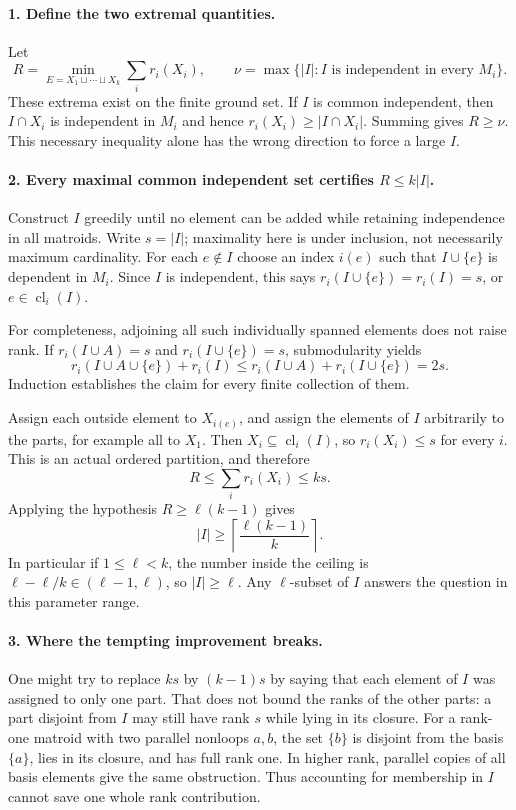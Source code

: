 \documentclass[11pt,a4paper]{article}
\begin{document}
\paragraph{1. Define the two extremal quantities.}
Let
\[
 R=\min_{E=X_1\sqcup\cdots\sqcup X_k}\sum_i r_i(X_i),\qquad
 \nu=\max\{|I|: I\text{ is independent in every }M_i\}.
\]
These extrema exist on the finite ground set. If $I$ is common
independent, then $I\cap X_i$ is independent in $M_i$ and hence
$r_i(X_i)\ge|I\cap X_i|$. Summing gives $R\ge\nu$. This
necessary inequality alone has the wrong direction to force a large $I$.

\paragraph{2. Every maximal common independent set certifies $R\le k|I|$.}
Construct $I$ greedily until no element can be added while retaining
independence in all matroids. Write $s=|I|$; maximality here is under
inclusion, not necessarily maximum cardinality. For each $e\notin I$
choose an index $i(e)$ such that $I\cup\{e\}$ is dependent in $M_i$.
Since $I$ is independent, this says
$r_i(I\cup\{e\})=r_i(I)=s$, or $e\in\operatorname{cl}_i(I)$.

For completeness, adjoining all such individually spanned elements
does not raise rank. If $r_i(I\cup A)=s$ and
$r_i(I\cup\{e\})=s$, submodularity yields
\[
 r_i(I\cup A\cup\{e\})+r_i(I)
 \le r_i(I\cup A)+r_i(I\cup\{e\})=2s.
\]
Induction establishes the claim for every finite collection of them.

Assign each outside element to $X_{i(e)}$, and assign the elements of
$I$ arbitrarily to the parts, for example all to $X_1$. Then
$X_i\subseteq\operatorname{cl}_i(I)$, so $r_i(X_i)\le s$ for
every $i$. This is an actual ordered partition, and therefore
\[
 R\le\sum_i r_i(X_i)\le ks.
\]
Applying the hypothesis $R\ge\ell(k-1)$ gives
\[
 |I|\ge\left\lceil\frac{\ell(k-1)}k\right\rceil.
\]
In particular if $1\le\ell<k$, the number inside the ceiling is
$\ell-\ell/k\in(\ell-1,\ell)$, so $|I|\ge\ell$. Any
$\ell$-subset of $I$ answers the question in this parameter range.

\paragraph{3. Where the tempting improvement breaks.}
One might try to replace $ks$ by $(k-1)s$ by saying that each element
of $I$ was assigned to only one part. That does not bound the ranks
of the other parts: a part disjoint from $I$ may still have rank $s$
while lying in its closure. For a rank-one matroid with two parallel
nonloops $a,b$, the set $\{b\}$ is disjoint from the basis $\{a\}$,
lies in its closure, and has full rank one. In higher rank, parallel
copies of all basis elements give the same obstruction. Thus accounting
for membership in $I$ cannot save one whole rank contribution.
\end{document}
